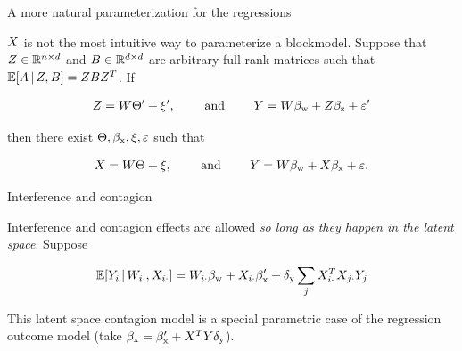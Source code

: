 \documentclass{beamer}
\theoremstyle{remark}
\begin{document}
\begin{frame}{A more natural parameterization for the regressions}

    $X$ is not the most intuitive way to parameterize a blockmodel. Suppose that $Z \in \mathbb{R}^{n \times d}$ and $B \in \mathbb{R}^{d \times d}$ are arbitrary full-rank matrices such that $\E[Z, B]{A} = Z B Z^T$. If

    \begin{align*}
        Z = W \Theta' + \xi',                     \qquad \text{ and } \qquad
        Y  = W \beta_\text{w} + Z \beta_\text{z} + \varepsilon'
    \end{align*}

    \noindent then there exist $\Theta, \beta_\text{x}, \xi, \varepsilon$ such that

    \begin{align*}
        X = W \Theta + \xi,                     \qquad \text{ and } \qquad
        Y  = W \beta_\text{w} + X \beta_\text{x} + \varepsilon.
    \end{align*}

\end{frame}

\begin{frame}{Interference and contagion}

    Interference and contagion effects are allowed \emph{so long as they happen in the latent space}. Suppose

    \begin{align*}
        \E[\W_{i \cdot}, \X_{i \cdot}]{Y_i}
        = \W_{i \cdot} \betaw + \X_{i \cdot} \beta'_\text{x} + \delta_\text{y} \sum_{j} \X_{i \cdot}^T \X_{j \cdot} Y_j
    \end{align*}

    This latent space contagion model is a special parametric case of the regression outcome model (take $\beta_\text{x} = \beta'_\text{x} + X^T Y \delta_\text{y}$).

\end{frame}





\end{document}
